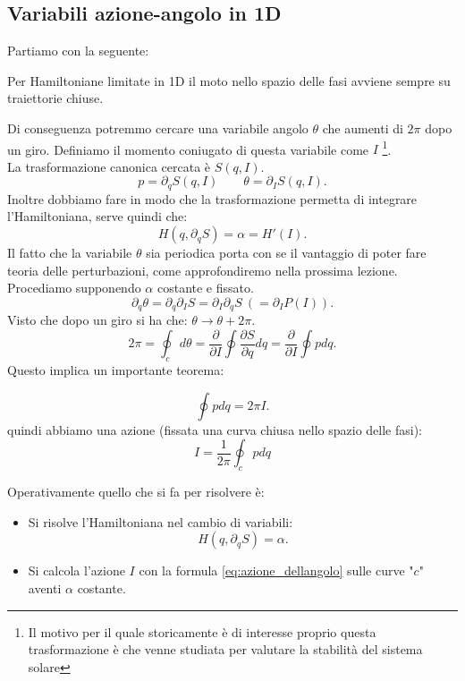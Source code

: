 \subsection{Variabili azione-angolo in 1D}%
\label{sub:Variabili azione-angolo}
Partiamo con la seguente:
\begin{redbox}{}
    Per Hamiltoniane limitate in 1D il moto nello spazio delle fasi avviene sempre su traiettorie chiuse.
\end{redbox}
\noindent
Di conseguenza potremmo cercare una variabile angolo $\theta$ che aumenti di $2\pi$ dopo un giro. Definiamo il momento coniugato di questa variabile come $I$
\footnote{Il motivo per il quale storicamente è di interesse proprio questa trasformazione è che venne studiata per valutare la stabilità del sistema solare}.\\
La trasformazione canonica cercata è $S(q, I)$.
\[
    p = \partial_{q}S(q,I) \qquad \theta  = \partial_{I}S(q,I) 
.\] 
Inoltre dobbiamo fare in modo che la trasformazione permetta di integrare l'Hamiltoniana, serve quindi che:
\[
    H(q, \partial_{q}S) = \alpha  = H'(I) 
.\] 
Il fatto che la variabile $\theta$ sia periodica porta con se il vantaggio di poter fare teoria delle perturbazioni, come approfondiremo nella prossima lezione.\\
Procediamo supponendo $\alpha$ costante e fissato. 
\[
    \partial_{q}\theta  = \partial_{q}\partial_{I}S = \partial_{I}\partial_{q}S \ ( = \partial_{I}P(I) ) 
.\] 
Visto che dopo un giro si ha che: $\theta\to \theta +2\pi$.
\[
    2\pi  = \oint _c d\theta  = \frac{\partial }{\partial I} \oint \frac{\partial S}{\partial q} dq = \frac{\partial }{\partial I} \oint p dq 
.\] 
Questo implica un importante teorema:
\begin{redbox}{}
    \[
        \oint pdq = 2\pi I 
    .\] 
    quindi abbiamo una azione (fissata una curva chiusa nello spazio delle fasi):
    \begin{equation}
        I = \frac{1}{2\pi}\oint_c pdq 
	\label{eq:azione_dellangolo}
    \end{equation}
\end{redbox}
\noindent
Operativamente quello che si fa per risolvere è:
\begin{itemize}
    \item Si risolve l'Hamiltoniana nel cambio di variabili:
	\[
	    H(q,\partial_{q}S) = \alpha
	.\] 
    \item Si calcola l'azione $I$ con la formula \ref{eq:azione_dellangolo} sulle curve "$c$" aventi $\alpha$ costante.
\end{itemize}

